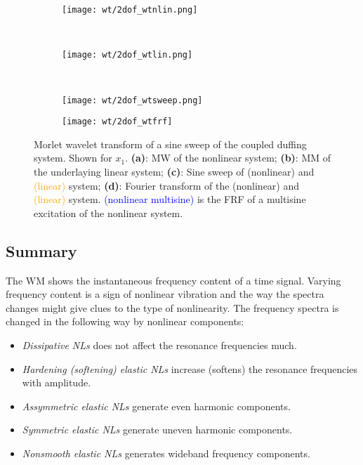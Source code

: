 \begin{figure}[!ht]
  \centering
  \begin{subfigure}[b]{0.48\textwidth}
    \texttt{[image: wt/2dof\_wtnlin.png]}
    \caption{}
  \end{subfigure}
  ~
  \begin{subfigure}[b]{0.48\textwidth}
    \texttt{[image: wt/2dof\_wtlin.png]}
    \caption{}
  \end{subfigure}
  \\
  \begin{subfigure}[b]{0.49\textwidth}
    \texttt{[image: wt/2dof\_wtsweep.png]}
    \caption{}
  \end{subfigure}
  \begin{subfigure}[b]{0.49\textwidth}
    \texttt{[image: wt/2dof\_wtfrf]}
    \caption{}
  \end{subfigure}
  \caption{Morlet wavelet transform of a sine sweep of the coupled duffing
    system. Shown for $x_1$.
    \textbf{(a)}: MW of the nonlinear system;
    \textbf{(b)}: MM of the underlaying linear system;
    \textbf{(c)}: Sine sweep of
    \sampleline{}(nonlinear) and
    \textcolor{orange}{(linear)} system;
    \textbf{(d)}: Fourier transform of the
    \sampleline{}(nonlinear) and
    \textcolor{orange}{(linear)} system.
    \textcolor{blue}{\sampleline{}(nonlinear multisine)} is the FRF of a
    multisine excitation of the nonlinear system.
  }
  \label{fig:mw_2dof}
\end{figure}


\subsection{Summary}
\label{sec:wt_transform}

The WM shows the instantaneous frequency content of a time signal. Varying
frequency content is a sign of nonlinear vibration and the way the spectra
changes might give clues to the type of nonlinearity.
The frequency spectra is changed in the following way by nonlinear components:

\begin{itemize}
\item \textit{Dissipative NLs} does not affect the resonance frequencies much.
\item \textit{Hardening (softening) elastic NLs} increase (softens) the resonance
  frequencies with amplitude.
\item \textit{Assymmetric elastic NLs} generate even harmonic components.
\item \textit{Symmetric elastic NLs} generate uneven harmonic components.
\item \textit{Nonsmooth elastic NLs} generates wideband frequency components.
\end{itemize}

